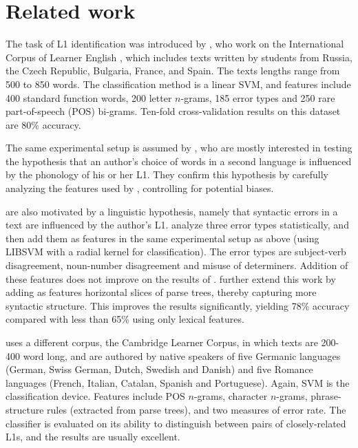\documentclass[11pt,letterpaper]{article}
\begin{document}
\section{Related work}
\label{sec:literature}
The task of L1 identification was introduced by
\citet{koppel2005automatically,koppel2005determining}, who work on the
International Corpus of Learner English \citep{icle}, which includes
texts written by students from Russia, the Czech Republic, Bulgaria,
France, and Spain. The texts lengths range from 500 to 850 words. The
classification method is a linear SVM, and features include 400
standard function words, 200 letter $n$-grams, 185 error types and 250
rare part-of-speech (POS) bi-grams. Ten-fold cross-validation results
on this dataset are 80\% accuracy.

The same experimental setup is assumed by
\citet{tsur-rappoport:2007:Cognitive-2007}, who are mostly interested
in testing the hypothesis that an author's choice of words in a second
language is influenced by the phonology of his or her L1. They confirm
this hypothesis by carefully analyzing the features used by
\citeauthor{koppel2005automatically}, controlling for potential
biases.

\citet{Wong-Dras:2009:ALTA2009,wong-dras:2011:EMNLP} are also
motivated by a linguistic hypothesis, namely that syntactic errors in
a text are influenced by the author's
L1. \citet{Wong-Dras:2009:ALTA2009} analyze three error types
statistically, and then add them as features in the same experimental
setup as above (using LIBSVM with a radial kernel for
classification). The error types are subject-verb disagreement,
noun-number disagreement and misuse of determiners. Addition of these
features does not improve on the results of
\citeauthor{koppel2005automatically}. \citet{wong-dras:2011:EMNLP}
further extend this work by adding as features horizontal slices of
parse trees, thereby capturing more syntactic structure. This improves
the results significantly, yielding 78\% accuracy compared with less
than 65\% using only lexical features.

\citet{kochmar2011identification} uses a different corpus, the
Cambridge Learner Corpus, in which texts are 200-400 word long, and
are authored by native speakers of five Germanic languages (German,
Swiss German, Dutch, Swedish and Danish) and five Romance languages
(French, Italian, Catalan, Spanish and Portuguese). Again, SVM is the
classification device. Features include POS $n$-grams, character
$n$-grams, phrase-structure rules (extracted from parse trees), and
two measures of error rate. The classifier is evaluated on its ability
to distinguish between pairs of closely-related L1s, and the results
are usually excellent.
\end{document}
